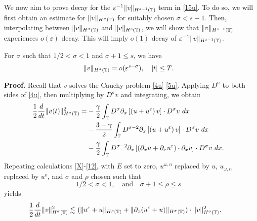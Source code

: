 We now aim to prove decay for the $\varepsilon^{-1}
\|v\|_{H^{s-1}(\mathbb{T})} $ term in \eqref{15u}. To do so, we 
will first obtain an estimate for
$\|v\|_{H^\sigma(\mathbb{T})}$ for suitably chosen $\sigma < s-1$. Then, 
interpolating between $\|v\|_{H^\sigma(\mathbb{T})}$
and $\|v\|_{H^s(\mathbb{T})}$, we will show that 
$\|v\|_{H^{s-1}(\mathbb{T})}$ experiences $o(\ee)$ decay. This will imply
$o(1)$ decay of $\varepsilon^{-1}
\|v\|_{H^{s-1}(\mathbb{T})} $.
%
%
\begin{proposition} \label{prop:6r}
For $\sigma$ such that $1/2 < \sigma < 1$ and $\sigma + 1 \le s$, we have
%
%
\begin{equation}
\begin{split}
\|v\|_{H^{\sigma}(\mathbb{T})} = o(\varepsilon^{s- \sigma }), \quad |t| \le T.
\end{split}
\end{equation}
%
%
\end{proposition}
%
%
%
\textbf{Proof.}
Recall that $v$ solves the Cauchy-problem \eqref{4u}-\eqref{5u}.
Applying $D^\sigma$ to both sides of \eqref{4u}, then multiplying by
$D^\sigma v$ and integrating, we obtain 
%
%
\begin{equation*}
\begin{split}
\frac{1}{2}\frac{d}{dt}\|v(t)\|_{H^\sigma(\mathbb{T})}^2
= & - \frac{\gamma}{2}\int_{\mathbb{T}} D^\sigma
\partial_x \left[ \left( u + u^\varepsilon \right)v
\right]\cdot D^\sigma v \ dx
\\
& - \frac{3-\gamma}{2}\int_{\mathbb{T}} D^{\sigma
-2} \partial_x \left[ \left( u + u^\varepsilon
\right)v \right] \cdot D^\sigma v \ dx
\\
& - \frac{\gamma}{2}\int_{\mathbb{T}} D^{\sigma
-2}
\partial_x \left[ \left( \partial_x u + \partial_x u^\varepsilon
\right)\cdot \partial_x v \right] \cdot
D^\sigma v \ dx.
\end{split}
\end{equation*}
%
%
Repeating calculations \eqref{X}-\eqref{12}, with $E$ set to zero,
$u^{\omega,n}$ replaced by $u$, $u_{\omega,n}$ replaced by $u^\ee$, and
$\sigma$ and $\rho$ chosen such that
%
%
%
\begin{equation*}
\label{size_of_sigma}
 1/2 < \sigma < 1,
 \quad 
 \text{and}
 \quad
 \sigma + 1 \le \rho \le s 
\end{equation*}
%
%
yields
%
%
\begin{equation*}
\begin{split}
\frac{1}{2}\frac{d}{dt} \|v\|_{H^\sigma(\mathbb{T})}^2
& \lesssim
(\|u^{\varepsilon} + u\|_{H^{\rho}(\mathbb{T})} +
\|\partial_x(u^{\varepsilon} + u) \|_{H^\sigma(\mathbb{T})})
\cdot \|v\|_{H^\sigma(\mathbb{T})}^2.
\end{split}
\end{equation*}
